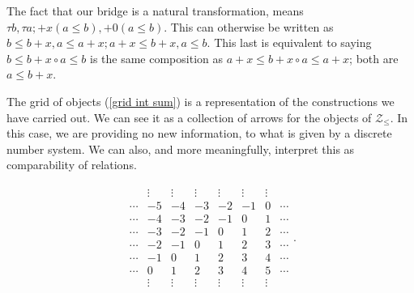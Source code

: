 \documentclass [12pt]{book}
\begin{document}
The fact that our bridge is a natural transformation, means
$\tau b,\tau a;+x(a\leq b),+0(a\leq b)$. This can otherwise be written as $b\leq b+x,a\leq a+x;a+x\leq b+x,a \leq b$. This last is equivalent to saying $b\leq b+x\circ a\leq b$ is the same composition as $a+x\leq b+x\circ a\leq a+x$; both are $a\leq b+x$.

The grid of objects (\ref{grid int sum}) is a representation of the constructions we have carried out. We can see it as a collection of arrows for the objects of $\mathcal{Z}_{\leq}$. In this case, we are providing no new information, to what is given by a discrete number system. We can also, and more meaningfully, interpret this as comparability of relations. 

\begin{eqnarray}\begin{array}{rrrrrrrr} & \vdots & \vdots & \vdots & \vdots & \vdots & \vdots & \\ \cdots & -5 & -4 & -3 & -2 & -1 & 0 & \cdots \\ \cdots & -4 & -3 & -2 & -1 & 0 & 1 &\cdots \\\cdots &-3 & -2 & -1 & 0 & 1 & 2 &\cdots\\ \cdots&-2 & -1 & 0 & 1 & 2 & 3&\cdots  \\\cdots& -1 & 0 & 1 & 2 & 3 & 4 &\cdots\\\cdots& 0 & 1 & 2 & 3 & 4 & 5&\cdots\\& \vdots & \vdots & \vdots & \vdots & \vdots & \vdots &\end{array}.\label{grid int sum}\end{eqnarray}
\end{document}
